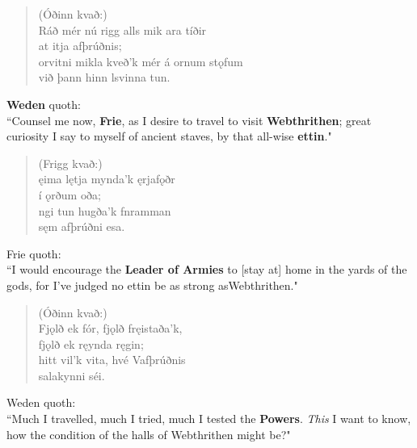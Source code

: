 \bookStart

\begin{verse}
(Óðinn kvað:) \\%
\bva Ráð mér nú rigg \hld alls mik ara tíðir \\%
\ind at itja afþrúðnis; \\%
orvitni mikla \hld kveð'k mér á ornum stǫfum \\%
\ind við þann hinn lsvinna tun.\\%
\end{verse}

\bvb \textbf{Weden} quoth: \\ “Counsel me now, \textbf{Frie}, as I desire to travel to visit \textbf{Webthrithen}; great curiosity I say to myself of ancient staves\footnotemark[1], by that all-wise \textbf{ettin}." \\

\begin{verse}
(Frigg kvað:) \\%
\bva {}ęima lętja \hld mynda'k ęrjafǫðr \\%
\ind í ǫrðum oða; \\%
ngi tun \hld hugða'k fnramman \\%
\ind sęm afþrúðni esa.\\%
\end{verse}

\bvb Frie quoth: \\ “I would encourage the \textbf{Leader of Armies} to [stay at] home in the yards of the gods, for I've judged no ettin be as strong as\footnotemark[3] Webthrithen." \\

\begin{verse}
(Óðinn kvað:) \\%
\bva Fjǫlð ek fór, \hld fjǫlð fręistaða'k, \\%
\ind fjǫlð ek ręynda ręgin; \\%
hitt vil'k vita, \hld hvé Vafþrúðnis \\%
\ind salakynni séi.\\%
\end{verse}

\bvb Weden quoth: \\ “Much I travelled, much I tried, much I tested the \textbf{Powers}\footnotemark[4]. \emph{This} I want to know, how the condition of the halls of Webthrithen might be?" \\

